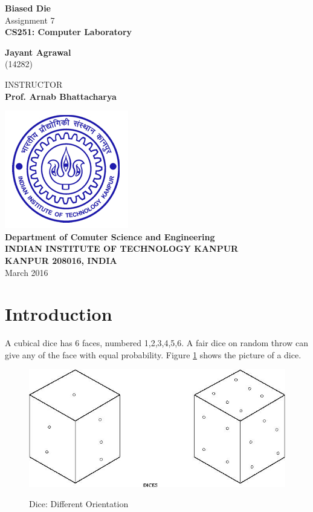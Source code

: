 \documentclass{article}
\begin{document}

\begin{center}

\textbf{\Huge Biased Die} \\
\vspace{50pt}
{\large Assignment 7 } \\
\textbf{\large CS251: Computer Laboratory} \\
\vspace{100pt}

\textbf{\large Jayant Agrawal} \\
(14282)
\vspace{30pt}

INSTRUCTOR \\
\textbf{Prof. Arnab Bhattacharya}
\vspace{100pt}

\includegraphics[width=0.3\columnwidth]{logo.jpg}\\
\textbf{\large Department of Comuter Science and Engineering \\
INDIAN INSTITUTE OF TECHNOLOGY KANPUR \\
KANPUR 208016, INDIA \\ } 
\vspace{20pt}
March 2016

\end{center}

\restoregeometry
\newpage
{}
\tableofcontents
{}
\listoffigures
\listoftables


\newpage
{}

\section{Introduction}
A cubical dice has 6 faces, numbered 1,2,3,4,5,6. A fair dice on random throw can give any of the face with equal probability. Figure \ref{fig:dice} shows the picture of a dice.
\begin{figure}[h!]
\begin{center}
\includegraphics[width=0.7\columnwidth]{script3.jpeg}
\label{fig:dice}
\caption{Dice: Different Orientation}
\end{center}
\end{figure}
\end{document}
